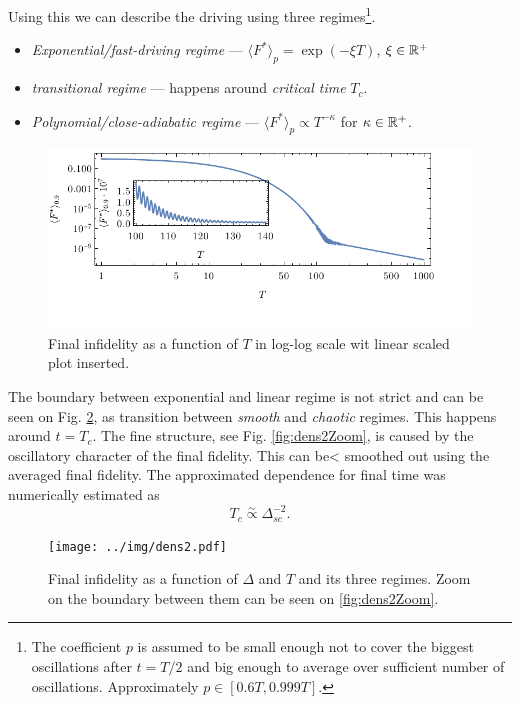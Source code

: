 Using this we can describe the driving using three regimes\footnote{The coefficient $p$ is assumed to be small enough not to cover the biggest oscillations after $t=T/2$ and big enough to average over sufficient number of oscillations. Approximately $p\in[0.6T,0.999T]$.}.
\begin{itemize}
    \item \emph{Exponential/fast-driving regime} — $\langle F^*\rangle_p= \exp(-\xi T)$, $\xi\in\mathbb{R}^+$
    \item \emph{transitional regime} — happens around \emph{critical time} $T_c$.
    \item \emph{Polynomial/close-adiabatic regime} — $\langle F^*\rangle_p\propto T^{-\kappa}$ for $\kappa\in \mathbb{R}^+$.
\end{itemize}

\begin{figure}[H]
    \centering
    \includegraphics[scale=1.2]{../img/infidCombined1.pdf}
    \caption{Final infidelity as a function of $T$ in log-log scale wit linear scaled plot inserted.}
    \label{fig:infidCombined}
\end{figure}



The boundary between exponential and linear regime is not strict and can be seen on Fig. \ref{fig:dens2}, as transition between \emph{smooth} and \emph{chaotic} regimes. This happens around $t=T_c$. The fine structure, see Fig. \ref{fig:dens2Zoom}, is caused by the oscillatory character of the final fidelity. This can be< smoothed out using the averaged final fidelity. The approximated dependence for final time was numerically estimated as
\begin{equation}
    T_c\overset{\sim}{\propto} \Delta_{sc}^{-2}.
\end{equation}


\begin{figure}[H]
    \centering 
    \texttt{[image: ../img/dens2.pdf]}
    \caption{Final infidelity as a function of $\Delta$ and $T$ and its three regimes. Zoom on the boundary between them can be seen on \ref{fig:dens2Zoom}.}
    \label{fig:dens2}
\end{figure}

